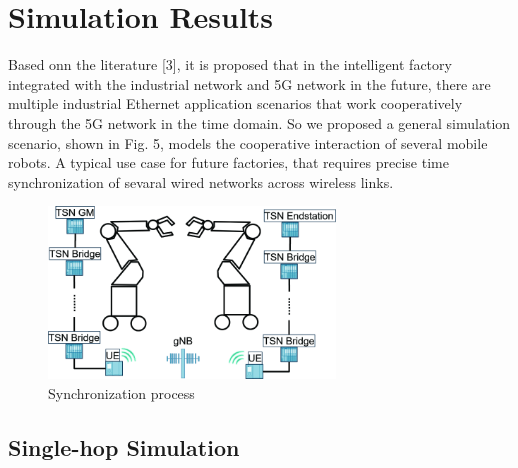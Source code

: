 \documentclass[english]{cccconf}
\begin{document}
\section{Simulation Results}
Based onn the literature [3], it is proposed that in the intelligent factory integrated with the industrial network and 5G network in the future, there are multiple industrial Ethernet application scenarios that work cooperatively through the 5G network in the time domain. So we proposed a general simulation scenario, shown in Fig. 5, models the cooperative interaction of several mobile robots. A typical use case for future factories, that requires precise time synchronization of sevaral wired networks across wireless links.
\begin{figure}[htbp]
	\centering
	\setcounter{figure}{4}
	\includegraphics[width=3in]{fig5.png}
	\caption{Synchronization process}
\end{figure}

\subsection{Single-hop Simulation}
\end{document}
